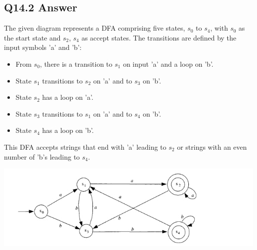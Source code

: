 \documentclass{article}
\begin{document}
\subsection*{Q14.2 Answer}
The given diagram represents a DFA comprising five states, \( s_0 \) to \( s_4 \), with \( s_0 \) as the start state and \( s_2 \), \( s_4 \) as accept states. The transitions are defined by the input symbols 'a' and 'b':
\begin{itemize}
    \item From \( s_0 \), there is a transition to \( s_1 \) on input 'a' and a loop on 'b'.
    \item State \( s_1 \) transitions to \( s_2 \) on 'a' and to \( s_3 \) on 'b'.
    \item State \( s_2 \) has a loop on 'a'.
    \item State \( s_3 \) transitions to \( s_1 \) on 'a' and to \( s_4 \) on 'b'.
    \item State \( s_4 \) has a loop on 'b'.
\end{itemize}
This DFA accepts strings that end with 'a' leading to \( s_2 \) or strings with an even number of 'b's leading to \( s_4 \).
\begin{center}
    \includegraphics[width=15cm]{1.png}
\end{center}
\newpage
\end{document}
